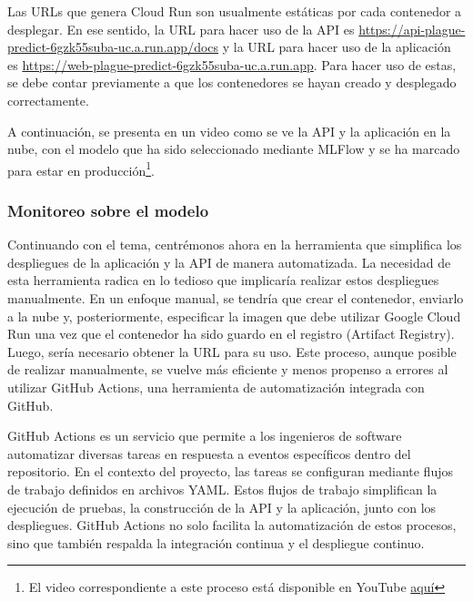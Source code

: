 Las URLs que genera Cloud Run son usualmente estáticas por cada contenedor a desplegar. En ese sentido, la URL para hacer uso de la API es \href{https://api-plague-predict-6gzk55suba-uc.a.run.app/docs}{https://api-plague-predict-6gzk55suba-uc.a.run.app/docs} y la URL para hacer uso de la aplicación es \href{https://web-plague-predict-6gzk55suba-uc.a.run.app}{https://web-plague-predict-6gzk55suba-uc.a.run.app}. Para hacer uso de estas, se debe contar previamente a que los contenedores se hayan creado y desplegado correctamente. \newline

A continuación, se presenta en un video como se ve la API y la aplicación en la nube, con el modelo que ha sido seleccionado mediante MLFlow y se ha marcado para estar en producción\footnote{El video correspondiente a este proceso está disponible en YouTube \href{https://youtu.be/GV5-WZFxAOU?si=juse0Gmu4mX00cAJ}{aquí}}.

\newpage

\subsubsection{Monitoreo sobre el modelo}

Continuando con el tema, centrémonos ahora en la herramienta que simplifica los despliegues de la aplicación y la API de manera automatizada. La necesidad de esta herramienta radica en lo tedioso que implicaría realizar estos despliegues manualmente. En un enfoque manual, se tendría que crear el contenedor, enviarlo a la nube y, posteriormente, especificar la imagen que debe utilizar Google Cloud Run una vez que el contenedor ha sido guardo en el registro (Artifact Registry). Luego, sería necesario obtener la URL para su uso. Este proceso, aunque posible de realizar manualmente, se vuelve más eficiente y menos propenso a errores al utilizar GitHub Actions, una herramienta de automatización integrada con GitHub. \newline

GitHub Actions es un servicio que permite a los ingenieros de software automatizar diversas tareas en respuesta a eventos específicos dentro del repositorio. En el contexto del proyecto, las tareas se configuran mediante flujos de trabajo definidos en archivos YAML. Estos flujos de trabajo simplifican la ejecución de pruebas, la construcción de la API y la aplicación, junto con los despliegues. GitHub Actions no solo facilita la automatización de estos procesos, sino que también respalda la integración continua y el despliegue continuo. \newline

